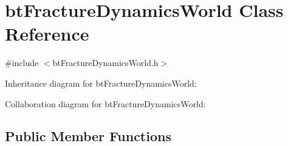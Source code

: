 \hypertarget{classbt_fracture_dynamics_world}{\section{bt\+Fracture\+Dynamics\+World Class Reference}
\label{classbt_fracture_dynamics_world}
}


{\ttfamily \#include $<$bt\+Fracture\+Dynamics\+World.\+h$>$}



Inheritance diagram for bt\+Fracture\+Dynamics\+World\+:


Collaboration diagram for bt\+Fracture\+Dynamics\+World\+:
\subsection*{Public Member Functions}
